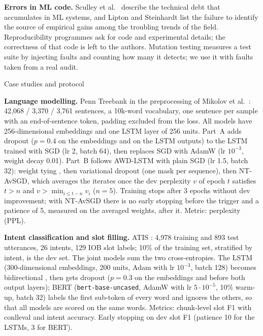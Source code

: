 \documentclass[10pt,twocolumn,a4paper]{article}
\makeatletter
\renewcommand\section{\@startsection{section}{1}{\z@}{-7pt plus -2pt minus -1pt}{3pt}%
  {\normalfont\normalsize\bfseries}}
\newcommand{\para}[1]{\textbf{#1}\hspace{0.4em}}
\makeatother
\begin{document}
\para{Errors in ML code.} Sculley et al.~\cite{sculley2015debt} describe the technical debt that accumulates in
ML systems, and Lipton and Steinhardt \cite{lipton2019troubling} list the failure to identify the source of
empirical gains among the troubling trends of the field. Reproducibility programmes \cite{pineau2021reproducibility}
ask for code and experimental details; the correctness of that code is left to the authors. Mutation testing \cite{demillo1978hints,jia2011mutation} measures a test suite by injecting faults
and counting how many it detects; we use it with faults taken from a real audit.

\section{Case studies and protocol}

\para{Language modelling.} Penn Treebank \cite{marcus1993ptb} in the preprocessing of Mikolov et
al.~\cite{mikolov2010rnnlm}: 42,068 / 3,370 / 3,761 sentences, a 10k-word vocabulary, one sentence per sample with
an end-of-sentence token, padding excluded from the loss. All models have 256-dimensional embeddings and one LSTM
layer \cite{hochreiter1997lstm} of 256 units. Part~A adds dropout \cite{srivastava2014dropout} ($p=0.4$ on the
embeddings and on the LSTM outputs) to the LSTM trained with SGD (lr 2, batch 64), then replaces SGD with AdamW
\cite{loshchilov2019adamw} (lr $10^{-3}$, weight decay 0.01). Part~B follows AWD-LSTM \cite{merity2018awdlstm} with
plain SGD (lr 1.5, batch 32): weight tying \cite{press2017tying,inan2017tying}, then variational dropout
\cite{gal2016dropout} (one mask per sequence), then NT-AvSGD, which averages the iterates \cite{polyak1992averaging}
once the dev perplexity $v$ of epoch $t$ satisfies $t>n$ and $v>\min_{i\le t-n} v_i$ ($n=5$). Training stops after 3
epochs without dev improvement; with NT-AvSGD there is no early stopping before the trigger and a patience of 5,
measured on the averaged weights, after it. Metric: perplexity (PPL).

\para{Intent classification and slot filling.} ATIS \cite{hemphill1990atis}: 4,978 training and 893 test
utterances, 26 intents, 129 IOB slot labels; 10\% of the training set, stratified by intent, is the dev set. The
joint models sum the two cross-entropies. The LSTM (300-dimensional embeddings, 200 units, Adam
\cite{kingma2015adam} with lr $10^{-3}$, batch 128) becomes bidirectional \cite{schuster1997birnn}, then gets dropout
($p=0.3$ on the embeddings and before both output layers); BERT \cite{devlin2019bert,chen2019jointbert}
(\texttt{bert-base-uncased}, AdamW with lr $5\cdot10^{-5}$, 10\% warm-up, batch 32) labels the first sub-token of
every word and ignores the others, so that all models are scored on the same words. Metrics: chunk-level slot F1
with conlleval \cite{tjongkimsang2000conll} and intent accuracy. Early stopping on dev slot F1 (patience 10 for the
LSTMs, 3 for BERT).
\end{document}

